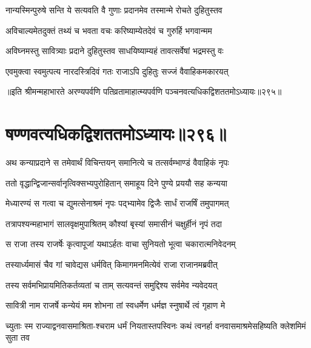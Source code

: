 \twolineshloka
{नान्यस्मिन्पुरुषे सन्ति ये सत्यवति वै गुणाः}
{प्रदानमेव तस्मान्मे रोचते दुहितुस्तव}




\twolineshloka
{अविचाल्यमेतदुक्तं तथ्यं च भवता वचः}
{करिष्याम्येतदेवं च गुरुर्हि भगवान्मम}




\twolineshloka
{अविघ्नमस्तु सावित्र्याः प्रदाने दुहितुस्तव}
{साधयिष्याम्यहं तावत्सर्वेषां भद्रमस्तु वः}




\twolineshloka
{एवमुक्त्वा स्वमुत्पत्य नारदस्त्रिदिवं गतः}
{राजाऽपि दुहितुः सज्जं वैवाहिकमकारयत्}


॥इति श्रीमन्महाभारते अरण्यपर्वणि पतिव्रतामाहात्म्यपर्वणि पञ्चनवत्यधिकद्विशततमोऽध्यायः॥२९५॥


\chapter{षण्णवत्यधिकद्विशततमोऽध्यायः॥२९६॥}


\twolineshloka
{अथ कन्याप्रदाने स तमेवार्थं विचिन्तयन्}
{समानित्ये च तत्सर्वम्भाण्डं वैवाहिकं नृपः}


\twolineshloka
{ततो वृद्धान्द्विजान्सर्वानृत्विक्सभ्यपुरोहितान्}
{समाहूय दिने पुण्ये प्रययौ सह कन्यया}


\twolineshloka
{मेध्यारण्यं स गत्वा च द्युमत्सेनाश्रमं नृपः}
{पद्भ्यामेव द्विजैः सार्धं राजर्षिं तमुपागमत्}


\twolineshloka
{तत्रापश्यन्महाभागं सालवृक्षमुपाश्रितम्}
{कौश्यां बृस्यां समासीनं चक्षुर्हीनं नृपं तदा}


\twolineshloka
{स राजा तस्य राजर्षेः कृत्वापूजां यथाऽर्हतः}
{वाचा सुनियतो भूत्वा चकारात्मनिवेदनम्}


\twolineshloka
{तस्यार्ध्यमासं चैव गां चावेद्यस धर्मवित्}
{किमागमनमित्येवं राजा राजानमब्रवीत्}


\twolineshloka
{तस्य सर्वमभिप्रायमितिकर्तव्यतां च ताम्}
{सत्यवन्तं समुद्दिश्य सर्वमेव न्यवेदयत्}


\twolineshloka
{सावित्री नाम राजर्षे कन्येयं मम शोभना}
{तां स्वधर्मेण धर्मज्ञ स्नुषार्थे त्वं गृहाण मे}




\twolineshloka
{च्युताः स्म राज्याद्वनवासमाश्रिता-श्चराम धर्मं नियतास्तपस्विनः}
{कथं त्वनर्हा वनवासमाश्रमेसहिष्यति क्लेशमिमं सुता तव}

